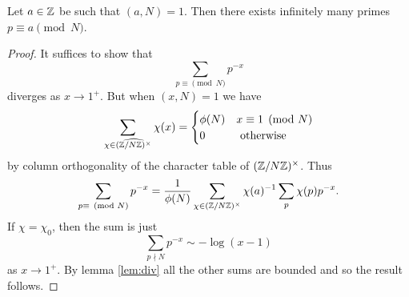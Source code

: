 \documentclass{memoir}
\begin{document}
\begin{thm}
    Let $a\in\mathbb{Z}$ be such that $(a,N) = 1$. Then there exists infinitely many primes $p\equiv a \pmod{N}$.
\end{thm}
\begin{proof}
    It suffices to show that 
    \begin{equation}
        \sum_{p\equiv\pmod{N}} p^{-x}
    \end{equation}
    diverges as $x\to1^+$.
    But when $(x,N) = 1$ we have
    \begin{equation}
    \sum_{\chi\in \widehat{(\mathbb{Z}/N\mathbb{Z})^\times}}\chi(x) = \begin{cases}\phi(N) & x\equiv 1\pmod{N} \\ 0 &\text{ otherwise}\end{cases}
    \end{equation}
    by column orthogonality of the character table of $(\mathbb{Z}/N\mathbb{Z})^\times$.
    Thus
    \begin{equation}
        \sum_{p\equiv\pmod{N}} p^{-x} = \frac1{\phi(N)} \sum_{\chi\in(\mathbb{Z}/N\mathbb{Z})^\times}\chi(a)^{-1}\sum_p\chi(p)p^{-x}.
    \end{equation}
    If $\chi = \chi_0$, then the sum is just 
    \begin{equation}
        \sum_{p\nmid N}p^{-x} \sim -\log(x-1)
    \end{equation}
    as $x\to1^+$.
    By lemma \ref{lem:div} all the other sums are bounded and so the result follows.
\end{proof}
\end{document}
